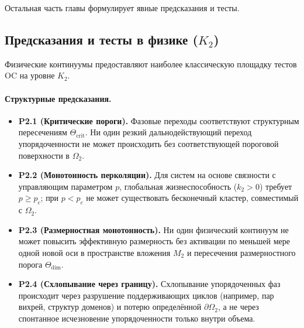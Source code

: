 Остальная часть главы формулирует явные предсказания и тесты.

\subsection{Предсказания и тесты в физике
            (\texorpdfstring{$K_2$}{K\_2})}

Физические континуумы предоставляют наиболее классическую площадку тестов OC на
уровне \(K_2\).

\paragraph{Структурные предсказания.}
\begin{itemize}
  \item \textbf{P2.1 (Критические пороги).}
        Фазовые переходы соответствуют структурным пересечениям
        \(\Theta_{\mathrm{crit}}\). Ни один резкий дальнодействующий
        переход упорядоченности не может происходить без соответствующей
        пороговой поверхности в \(\Omega_2\).
  \item \textbf{P2.2 (Монотонность перколяции).}
        Для систем на основе связности с управляющим параметром \(p\),
        глобальная жизнеспособность (\(k_2>0\)) требует \(p \ge p_c\);
        при \(p<p_c\) не может существовать бесконечный кластер,
        совместимый с \(\Omega_2\).
  \item \textbf{P2.3 (Размерностная монотонность).}
        Ни один физический континуум не может повысить эффективную размерность
        без активации по меньшей мере одной новой оси в пространстве вложения
        \(M_2\) и пересечения размерностного порога
        \(\Theta_{\mathrm{dim}}\).
  \item \textbf{P2.4 (Схлопывание через границу).}
        Схлопывание упорядоченных фаз происходит через разрушение поддерживающих
        циклов (например, пар вихрей, структур доменов) и потерю
        определённой \(\partial\Omega_2\), а не через спонтанное исчезновение
        упорядоченности только внутри объема.
\end{itemize}

